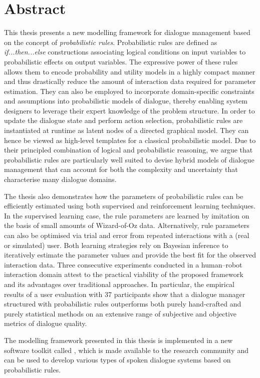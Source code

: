 \chapter*{Abstract}

This thesis presents a new modelling framework for dialogue management based on the concept of \textit{probabilistic rules}.  Probabilistic rules are defined as \textit{if...then...else} constructions associating logical conditions on input variables to probabilistic effects on output variables. The expressive power of these rules allows them to encode probability and utility models in a highly compact manner and thus drastically reduce the amount of interaction data required for parameter estimation. They can also be employed to incorporate domain-specific constraints and assumptions into probabilistic models of dialogue, thereby enabling system designers to leverage their expert knowledge of the problem structure.  In order to update the dialogue state and perform action selection, probabilistic rules are instantiated at runtime as latent nodes of a directed graphical model.  They can hence be viewed as high-level templates for a classical probabilistic model. Due to their principled combination of logical and probabilistic reasoning, we argue that probabilistic rules are particularly well suited to devise hybrid models of dialogue management that can account for both the complexity and uncertainty that characterise many dialogue domains.

The thesis also demonstrates how the parameters of probabilistic rules can be efficiently estimated using both supervised and reinforcement learning techniques. In the supervised learning case, the rule parameters are learned by imitation on the basis of small amounts of Wizard-of-Oz data.  Alternatively, rule parameters can also be optimised via trial and error from repeated interactions with a (real or simulated) user. Both learning strategies rely on Bayesian inference to iteratively estimate the parameter values and provide the best fit for the observed interaction data. Three consecutive experiments conducted in a human--robot interaction domain attest to the practical viability of the proposed framework and its advantages over traditional approaches.  In particular, the empirical results of a user evaluation with 37 participants show that a dialogue manager structured with probabilistic rules outperforms both purely hand-crafted and purely statistical methods on an extensive range of subjective and objective metrics of dialogue quality.

The modelling framework presented in this thesis is implemented in a new software toolkit called \opendial{}, which is made available to the research community and can be used to develop various types of spoken dialogue systems based on probabilistic rules. 
